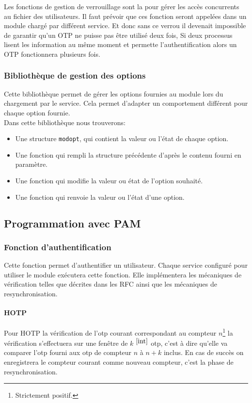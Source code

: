 Les fonctions de gestion de verrouillage sont la pour gérer les accès concurrents 
au fichier des utilisateurs. Il faut prévoir que ces fonction seront appelées 
dans un module chargé par différent service. Et donc sans ce verrou il devenait 
impossible de garantir qu'un OTP ne puisse pas être utilisé deux fois, Si deux 
processus lisent les information au même moment et permette l'authentification 
alors un OTP fonctionnera plusieurs fois.

\subsubsection{Bibliothèque de gestion des options}
Cette bibliothèque permet de gérer les options fournies au module lors du chargement
par le service. Cela permet d'adapter un comportement différent pour chaque option fournie.\\
Dans cette bibliothèque nous trouverons:
\begin{itemize}
  \item Une structure \verb?modopt?, qui contient la valeur ou l'état de chaque option.
  \item Une fonction qui rempli la structure précédente d'après le contenu fourni en paramètre.
  \item Une fonction qui modifie la valeur ou état de l'option souhaité.
  \item Une fonction qui renvoie la valeur ou l'état d'une option.
\end{itemize}

\subsection{Programmation avec PAM}
\subsubsection{Fonction d'authentification}
Cette fonction permet d'authentifier un utilisateur. Chaque service configuré
pour utiliser le module exécutera cette fonction. Elle implémentera les 
mécaniques de vérification telles que décrites dans les RFC ainsi que les 
mécaniques de resynchronisation.
\paragraph{HOTP}
Pour HOTP la vérification de l'otp courant correspondant au compteur 
$n$\footnote{Strictement positif.\label{int}} la vérification s'effectuera sur 
une fenêtre de  $k$ $^{\ref{int}}$ otp, c'est à dire qu'elle va comparer l'otp 
fourni aux otp de compteur $n$ à $n+k$ inclus. En cas de succès on enregistrera 
le compteur courant comme nouveau compteur, c'est la phase de resynchronisation.
